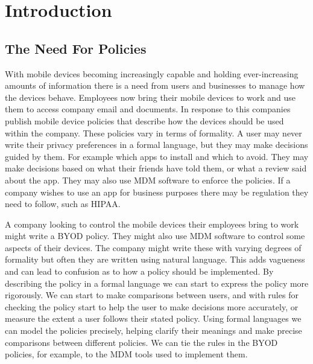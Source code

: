 \documentclass[thesis.tex]{subfiles}
\begin{document}
\chapter{Introduction}


\section{The Need For Policies}

With mobile devices becoming increasingly capable and holding
ever-increasing amounts of information there is a need from users and
businesses to manage how the devices behave.  Employees now bring
their mobile devices to work and use them to access company email and
documents.  In response to this companies publish mobile device
policies that describe how the devices should be used within the
company.  These policies vary in terms of formality.  A user may never
write their privacy preferences in a formal language, but they may
make decisions guided by them.  For example which apps to install and
which to avoid.  They may make decisions based on what their friends
have told them, or what a review said about the app.  They may also
use \ac{MDM} software to enforce the policies.  If a company wishes to
use an app for business purposes there may be regulation they need to
follow, such as \ac{HIPAA}.

A company looking to control the mobile devices their employees bring
to work might write a \ac{BYOD} policy.  They might also use \ac{MDM}
software to control some aspects of their devices.  The company might
write these with varying degrees of formality but often they are
written using natural language.  This adds vagueness and can lead to
confusion as to how a policy should be implemented.  By describing the
policy in a formal language we can start to express the policy more
rigorously.  We can start to make comparisons between users, and with
rules for checking the policy start to help the user to make decisions
more accurately, or measure the extent a user follows their stated
policy.  Using formal languages we can
model the policies precisely, helping clarify their meanings and make
precise comparisons between different policies.  We can tie the rules
in the \ac{BYOD} policies, for example, to the \ac{MDM} tools used to
implement them.
\end{document}
